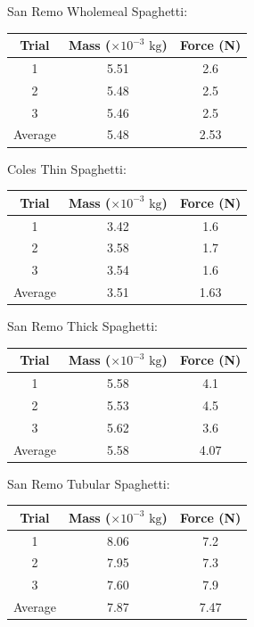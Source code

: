 \documentclass[a4paper,11pt]{article}
\begin{document}
San Remo Wholemeal Spaghetti:

\begin{center}
\begin{tabular}{|c|c|c|}
\hline
Trial & Mass ($\times 10^{-3}\mbox{ kg}$) & Force (N) \\
\hline
1       & 5.51 & 2.6 \\
2       & 5.48 & 2.5 \\
3       & 5.46 & 2.5 \\
\hline
Average & 5.48 & 2.53 \\
\hline
\end{tabular}
\end{center}

Coles Thin Spaghetti:

\begin{center}
\begin{tabular}{|c|c|c|}
\hline
Trial & Mass ($\times 10^{-3}\mbox{ kg}$) & Force (N) \\
\hline
1       & 3.42 & 1.6 \\
2       & 3.58 & 1.7 \\
3       & 3.54 & 1.6 \\
\hline
Average & 3.51 & 1.63 \\
\hline
\end{tabular}
\end{center}

San Remo Thick Spaghetti:

\begin{center}
\begin{tabular}{|c|c|c|}
\hline
Trial & Mass ($\times 10^{-3}\mbox{ kg}$) & Force (N) \\
\hline
1       & 5.58 & 4.1 \\
2       & 5.53 & 4.5 \\
3       & 5.62 & 3.6 \\
\hline
Average & 5.58 & 4.07 \\
\hline
\end{tabular}
\end{center}

San Remo Tubular Spaghetti:

\begin{center}
\begin{tabular}{|c|c|c|}
\hline
Trial & Mass ($\times 10^{-3}\mbox{ kg}$) & Force (N) \\
\hline
1       & 8.06 & 7.2 \\
2       & 7.95 & 7.3 \\
3       & 7.60 & 7.9 \\
\hline
Average & 7.87 & 7.47 \\
\hline
\end{tabular}
\end{center}
\end{document}
